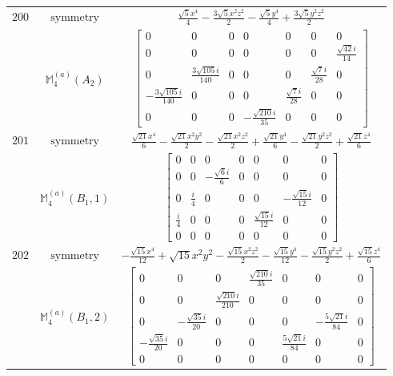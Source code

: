 \documentclass[fleqn,8pt,landscape]{jsarticle}
\begin{document}
\begin{longtable}{ccc}
$ 200 $ & $ \text{symmetry} $ & $ \frac{\sqrt{5} x^{4}}{4} - \frac{3 \sqrt{5} x^{2} z^{2}}{2} - \frac{\sqrt{5} y^{4}}{4} + \frac{3 \sqrt{5} y^{2} z^{2}}{2} $ \\
$  $ & $ \mathbb{M}_{4}^{(a)}(A_{2}) $ & $ \begin{bmatrix} 0 & 0 & 0 & 0 & 0 & 0 & 0 \\ 0 & 0 & 0 & 0 & 0 & 0 & \frac{\sqrt{42} i}{14} \\ 0 & \frac{3 \sqrt{105} i}{140} & 0 & 0 & 0 & \frac{\sqrt{7} i}{28} & 0 \\ - \frac{3 \sqrt{105} i}{140} & 0 & 0 & 0 & \frac{\sqrt{7} i}{28} & 0 & 0 \\ 0 & 0 & 0 & - \frac{\sqrt{210} i}{35} & 0 & 0 & 0 \end{bmatrix} $ \\ \hline
$ 201 $ & $ \text{symmetry} $ & $ \frac{\sqrt{21} x^{4}}{6} - \frac{\sqrt{21} x^{2} y^{2}}{2} - \frac{\sqrt{21} x^{2} z^{2}}{2} + \frac{\sqrt{21} y^{4}}{6} - \frac{\sqrt{21} y^{2} z^{2}}{2} + \frac{\sqrt{21} z^{4}}{6} $ \\
$  $ & $ \mathbb{M}_{4}^{(a)}(B_{1},1) $ & $ \begin{bmatrix} 0 & 0 & 0 & 0 & 0 & 0 & 0 \\ 0 & 0 & - \frac{\sqrt{6} i}{6} & 0 & 0 & 0 & 0 \\ 0 & \frac{i}{4} & 0 & 0 & 0 & - \frac{\sqrt{15} i}{12} & 0 \\ \frac{i}{4} & 0 & 0 & 0 & \frac{\sqrt{15} i}{12} & 0 & 0 \\ 0 & 0 & 0 & 0 & 0 & 0 & 0 \end{bmatrix} $ \\ \hline
$ 202 $ & $ \text{symmetry} $ & $ - \frac{\sqrt{15} x^{4}}{12} + \sqrt{15} x^{2} y^{2} - \frac{\sqrt{15} x^{2} z^{2}}{2} - \frac{\sqrt{15} y^{4}}{12} - \frac{\sqrt{15} y^{2} z^{2}}{2} + \frac{\sqrt{15} z^{4}}{6} $ \\
$  $ & $ \mathbb{M}_{4}^{(a)}(B_{1},2) $ & $ \begin{bmatrix} 0 & 0 & 0 & \frac{\sqrt{210} i}{35} & 0 & 0 & 0 \\ 0 & 0 & \frac{\sqrt{210} i}{210} & 0 & 0 & 0 & 0 \\ 0 & - \frac{\sqrt{35} i}{20} & 0 & 0 & 0 & - \frac{5 \sqrt{21} i}{84} & 0 \\ - \frac{\sqrt{35} i}{20} & 0 & 0 & 0 & \frac{5 \sqrt{21} i}{84} & 0 & 0 \\ 0 & 0 & 0 & 0 & 0 & 0 & 0 \end{bmatrix} $ \\ \hline

\end{longtable}
\end{document}
